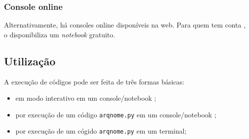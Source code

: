 \documentclass[12pt]{article}
\begin{document}
\subsubsection{Console online}

Alternativamente, há consoles online {\python} disponíveis na web. Para quem tem conta {\google}, o {\colab} disponibiliza um \emph{notebook} {\python} gratuito. 

\subsection{Utilização}

A execução de códigos {\python} pode ser feita de três formas básicas:
\begin{itemize}
\item em modo interativo em um console/notebook {\python};
\item por execução de um código \verb+arqnome.py+ em um console/notebook {\python};
\item por execução de um cógido \verb+arqnome.py+ em um terminal;
\end{itemize}
\end{document}
